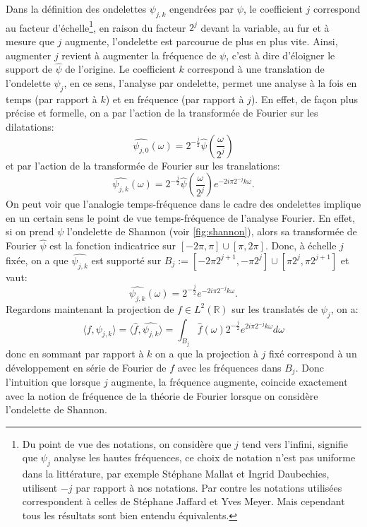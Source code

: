 \begin{remarque}
	Dans la définition des ondelettes $\psi_{j,k}$ engendrées par $\psi$, le coefficient $j$ correspond au facteur d'échelle\footnote{Du point de vue des notations, on considère que $j$ tend vers l'infini, signifie que $\psi_j$ analyse les hautes fréquences, ce choix de notation n'est pas uniforme dans la littérature, par exemple Stéphane Mallat et Ingrid Daubechies, utilisent $-j$ par rapport à nos notations. Par contre les notations utilisées correspondent à celles de Stéphane Jaffard et Yves Meyer. Mais cependant tous les résultats sont bien entendu équivalents.},
	en raison du facteur $2^j$ devant la variable, au fur et à mesure que $j$ augmente, l'ondelette est parcourue de plus en plus vite. Ainsi, augmenter $j$ revient à augmenter la fréquence de $\psi$, c'est à dire d'éloigner le support de $\hat{\psi}$ de l'origine. 
	Le coefficient $k$ correspond à une translation de l'ondelette $\psi_j$, en ce sens, l'analyse par ondelette, permet une analyse à la fois en temps (par rapport à $k$) et en fréquence (par rapport à $j$).
	\newline 
	En effet, de façon plus précise et formelle, on a par l'action de la transformée de Fourier sur les dilatations: 
	\begin{equation}
		\widehat{\psi_{j,0}}(\omega) = 2^{-\frac{j}{2}}\hat{\psi}(\frac{\omega}{2^j})
	\end{equation}
	et par l'action de la transformée de Fourier sur les translations:
	\begin{equation}
		\widehat{\psi_{j,k}}(\omega) = 2^{-\frac{j}{2}}\hat{\psi}(\frac{\omega}{2^j})e^{-2i\pi 2^{-j}k\omega}.
	\end{equation}
	On peut voir que l'analogie temps-fréquence dans le cadre des ondelettes implique en un certain sens le point de vue temps-fréquence de l'analyse Fourier.
	En effet, si on prend $\psi$ l'ondelette de Shannon (voir \ref{fig:shannon}), alors sa transformée de Fourier $\hat{\psi}$ est la fonction indicatrice sur $[-2\pi, \pi]\cup[\pi, 2\pi]$.
	Donc, à échelle $j$ fixée, on a que $\widehat{\psi_{j,k}}$ est supporté sur $B_j := [-2\pi2^{j+1}, -\pi2^j]\cup[\pi2^j, \pi2^{j+1}]$ et vaut:
	\begin{equation}
		\widehat{\psi_{j,k}}(\omega) = 2^{-\frac{j}{2}}e^{-2i\pi 2^{-j}k\omega}.
	\end{equation}
	Regardons maintenant la projection de $f\in L^2(\mathbb{R})$ sur les translatés de $\psi_j$, on a:
	\begin{equation}
		\langle f, \psi_{j,k} \rangle = \langle \hat{f}, \widehat{\psi_{j,k}} \rangle = \int_{B_j} \hat{f}(\omega) 2^{-\frac{j}{2}} e^{2i\pi2^{-j}k\omega} d\omega
	\end{equation}	
	donc en sommant par rapport à $k$ on a que la projection à $j$ fixé correspond à un développement en série de Fourier de $f$ avec les fréquences dans $B_j$.
	Donc l'intuition que lorsque $j$ augmente, la fréquence augmente, coincide exactement avec la notion de fréquence de la théorie de Fourier lorsque on considère l'ondelette de Shannon.

\end{remarque}

